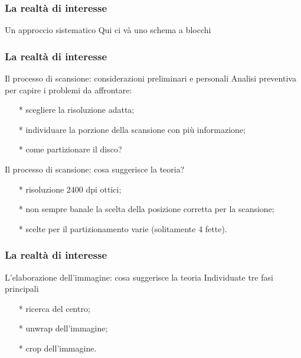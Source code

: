 \begin{frame}
\frametitle{La realtà di interesse}
\begin{block}{Un approccio sistematico}
Qui ci và uno schema a blocchi 
\end{block}
\end{frame}

\begin{frame}
\frametitle{La realtà di interesse}
\begin{block}{Il processo di scansione: considerazioni preliminari e personali}
Analisi preventiva per capire i problemi da affrontare:
\begin{itemize}
\item[*] scegliere la risoluzione adatta;
\item[*] individuare la porzione della scansione con più informazione;
\item[*] come partizionare il disco?
\end{itemize}
\end{block}

\begin{block}{Il processo di scansione: cosa suggerisce la teoria?}
\begin{itemize}
\item[*] risoluzione 2400 dpi ottici;
\item[*] non sempre banale la scelta della posizione corretta per la scansione;
\item[*] scelte per il partizionamento varie (solitamente 4 fette).
\end{itemize}
\end{block}
\end{frame}

\begin{frame}
\frametitle{La realtà di interesse}
\begin{block}{L'elaborazione dell'immagine: cosa suggerisce la teoria}
Individuate tre fasi principali
\begin{itemize}
\item[*] ricerca del centro;
\item[*] unwrap dell'immagine;
\item[*] crop dell'immagine.
\end{itemize}
\end{block}
\end{frame}

